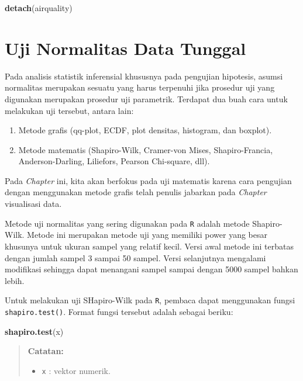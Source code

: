 \documentclass[]{book}
\newenvironment{Shaded}{\begin{snugshade}}{\end{snugshade}}
\newcommand{\KeywordTok}[1]{\textcolor[rgb]{0.13,0.29,0.53}{\textbf{#1}}}
\newcommand{\NormalTok}[1]{#1}
\providecommand{\tightlist}{%
  \setlength{\itemsep}{0pt}\setlength{\parskip}{0pt}}
\theoremstyle{definition}
\theoremstyle{definition}
\theoremstyle{definition}
\theoremstyle{remark}
\begin{document}
\begin{Shaded}
\begin{Highlighting}[]
\KeywordTok{detach}\NormalTok{(airquality)}
\end{Highlighting}
\end{Shaded}

\hypertarget{norm}{%
\section{Uji Normalitas Data Tunggal}\label{norm}}

Pada analisis statistik inferensial khususnya pada pengujian hipotesis, asumsi normalitas merupakan sesuatu yang harus terpenuhi jika prosedur uji yang digunakan merupakan prosedur uji parametrik. Terdapat dua buah cara untuk melakukan uji tersebut, antara lain:

\begin{enumerate}
\def\labelenumi{\arabic{enumi}.}
\tightlist
\item
  Metode grafis (qq-plot, ECDF, plot densitas, histogram, dan boxplot).
\item
  Metode matematis (Shapiro-Wilk, Cramer-von Mises, Shapiro-Francia, Anderson-Darling, Liliefors, Pearson Chi-square, dll).
\end{enumerate}

Pada \emph{Chapter} ini, kita akan berfokus pada uji matematis karena cara pengujian dengan menggunakan metode grafis telah penulis jabarkan pada \emph{Chapter} visualisasi data.

Metode uji normalitas yang sering digunakan pada \texttt{R} adalah metode Shapiro-Wilk. Metode ini merupakan metode uji yang memiliki power yang besar khusunya untuk ukuran sampel yang relatif kecil. Versi awal metode ini terbatas dengan jumlah sampel 3 sampai 50 sampel. Versi selanjutnya mengalami modifikasi sehingga dapat menangani sampel sampai dengan 5000 sampel bahkan lebih.

Untuk melakukan uji SHapiro-Wilk pada \texttt{R}, pembaca dapat menggunakan fungsi \texttt{shapiro.test()}. Format fungsi tersebut adalah sebagai beriku:

\begin{Shaded}
\begin{Highlighting}[]
\KeywordTok{shapiro.test}\NormalTok{(x)}
\end{Highlighting}
\end{Shaded}

\begin{quote}
\textbf{Catatan:}

\begin{itemize}
\tightlist
\item
  \texttt{x} : vektor numerik.
\end{itemize}
\end{quote}
\end{document}
